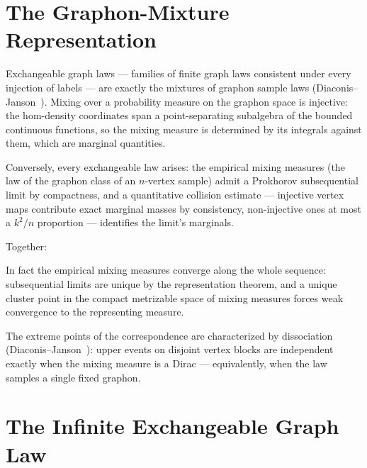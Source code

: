 
\section{The Graphon-Mixture Representation}

Exchangeable graph laws — families of finite graph laws consistent under every
injection of labels — are exactly the mixtures of graphon sample laws
(Diaconis--Janson~\cite[Theorem~5.3]{diaconisjanson2008}). Mixing over a probability
measure on the graphon space is injective: the hom-density coordinates span a
point-separating subalgebra of the bounded continuous functions, so the mixing measure
is determined by its integrals against them, which are marginal quantities.


Conversely, every exchangeable law arises: the empirical mixing measures (the law of
the graphon class of an $n$-vertex sample) admit a Prokhorov subsequential limit by
compactness, and a quantitative collision estimate — injective vertex maps contribute
exact marginal masses by consistency, non-injective ones at most a $k^2/n$ proportion —
identifies the limit's marginals.


Together:


In fact the empirical mixing measures converge along the whole sequence: subsequential
limits are unique by the representation theorem, and a unique cluster point in the
compact metrizable space of mixing measures forces weak convergence to the
representing measure.


The extreme points of the correspondence are characterized by dissociation
(Diaconis--Janson~\cite[Theorem~5.5]{diaconisjanson2008}): upper events on disjoint
vertex blocks are independent exactly when the mixing measure is a Dirac — equivalently,
when the law samples a single fixed graphon.


\section{The Infinite Exchangeable Graph Law}

